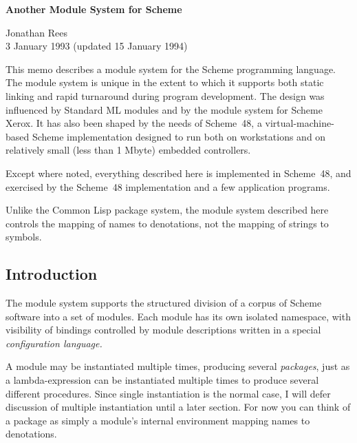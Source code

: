 



\newcommand{\goesto}{\hbox{$\longrightarrow$}}
\newcommand{\alt}{$\vert$}
\newcommand{\arbno}[1]{{{#1}$^*$}}
\newcommand{\hack}{Scheme~48}



\begin{center}
{\Large\bf Another Module System for Scheme}

\vspace{2ex}
Jonathan Rees \\
3 January 1993 (updated 15 January 1994)
\end{center}

\vspace{3ex}

This memo describes a module system for the Scheme programming
language.  The module system is unique in the extent to which it
supports both static linking and rapid turnaround during program
development.  The design was influenced by Standard ML
modules\cite{MacQueen:Modules} and by the module system for Scheme
Xerox\cite{Curtis-Rauen:Modules}.  It has also been shaped by the
needs of \hack{}, a virtual-machine-based Scheme implementation
designed to run both on workstations and on relatively small (less
than 1 Mbyte) embedded controllers.

Except where noted, everything described here is implemented in
\hack{}, and exercised by the \hack{} implementation and a few
application programs.

Unlike the Common Lisp package system, the module system described
here controls the mapping of names to denotations, not the
mapping of strings to symbols.


\subsection*{Introduction}

The module system supports the structured division of a corpus of
Scheme software into a set of modules.  Each module has its own
isolated namespace, with visibility of bindings controlled by module
descriptions written in a special {\em configuration language.}

A module may be instantiated multiple times, producing several {\em
packages}, just as a lambda-expression can be instantiated multiple
times to produce several different procedures.  Since single
instantiation is the normal case, I will defer discussion of multiple
instantiation until a later section.  For now you can think of a
package as simply a module's internal environment mapping names to
denotations.

